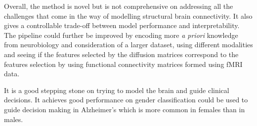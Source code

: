 \documentclass[msthesis.tex]{subfiles}
\begin{document}
Overall, the method is novel but is not comprehensive on addressing all the challenges that come in the way of modelling structural brain connectivity. It also gives a controllable trade-off between model performance and interpretability. The pipeline could further be improved by encoding more \textit{a priori} knowledge from neurobiology and consideration of a larger dataset, using different modalities and seeing if the features selected by the diffusion matrices correspond to the features selection by using functional connectivity matrices formed using fMRI data.

It is a good stepping stone on trying to model the brain and guide clinical decisions. It achieves good performance on gender classification could be used to guide decision making in Alzheimer's which is more common in females than in males.
\end{document}
